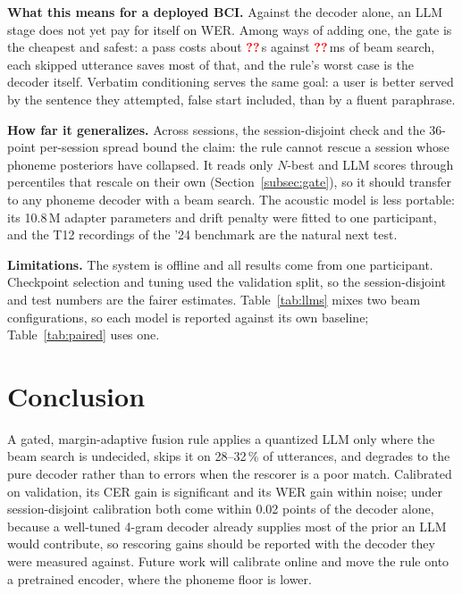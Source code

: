 \documentclass[conference,a4paper,10pt]{IEEEtran}
\newcommand{\pct}{\,\%}
\newcommand{\RvPend}{\textcolor{red}{\textbf{??}}}
\newcommand{\RvTdec}{\RvPend}
\newcommand{\RvTllm}{\RvPend}
\begin{document}
\textbf{What this means for a deployed BCI.} Against the decoder alone, an LLM
stage does not yet pay for itself on WER. Among ways of adding one, the gate is
the cheapest and safest: a pass costs about \RvTllm\,s against \RvTdec\,ms of
beam search, each skipped utterance saves most of that, and the rule's worst
case is the decoder itself. Verbatim conditioning
serves the same goal: a user is better served by the sentence they attempted,
false start included, than by a fluent paraphrase.

\textbf{How far it generalizes.} Across sessions, the session-disjoint check and
the 36-point per-session spread bound the claim: the rule cannot rescue a session
whose phoneme posteriors have collapsed. It reads only $N$-best and LLM scores
through percentiles that rescale on their own (Section~\ref{subsec:gate}), so it
should transfer to any phoneme decoder with a beam search. The acoustic model is less
portable: its 10.8\,M adapter parameters and drift penalty were fitted to one
participant, and the T12 recordings of the '24 benchmark
\cite{willett2024benchmark} are the natural next test.

\textbf{Limitations.} The system is offline and all results come from one
participant. Checkpoint selection and tuning used the validation split, so the
session-disjoint and test numbers are the fairer estimates. Table~\ref{tab:llms} mixes two beam configurations, so each model
is reported against its own baseline; Table~\ref{tab:paired} uses one.

\section{Conclusion}
A gated, margin-adaptive fusion rule applies a quantized LLM only where the beam
search is undecided, skips it on 28--32\pct{} of utterances, and degrades to the
pure decoder rather than to errors when the rescorer is a poor match. Calibrated
on validation, its CER gain is significant and its WER gain within noise; under
session-disjoint calibration both come within 0.02 points of the decoder alone,
because a well-tuned 4-gram decoder already supplies
most of the prior an LLM would contribute, so rescoring gains should be reported
with the decoder they were measured against. Future work will calibrate online
and move the rule onto a pretrained encoder, where the phoneme floor is lower.
\end{document}
